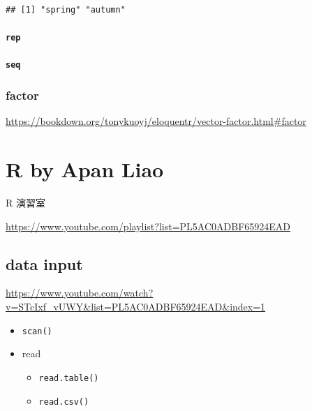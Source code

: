 \documentclass[
]{book}
\providecommand{\tightlist}{%
  \setlength{\itemsep}{0pt}\setlength{\parskip}{0pt}}
\theoremstyle{definition}
\theoremstyle{definition}
\theoremstyle{definition}
\theoremstyle{definition}
\theoremstyle{remark}
\begin{document}
\begin{verbatim}
## [1] "spring" "autumn"
\end{verbatim}

\hypertarget{rep}{%
\paragraph{\texorpdfstring{\texttt{rep}}{rep}}\label{rep}}

\hypertarget{seq}{%
\paragraph{\texorpdfstring{\texttt{seq}}{seq}}\label{seq}}

\hypertarget{factor}{%
\subsubsection{factor}\label{factor}}

\url{https://bookdown.org/tonykuoyj/eloquentr/vector-factor.html\#factor}

\hypertarget{r-by-apan-liao}{%
\section{R by Apan Liao}\label{r-by-apan-liao}}

\begin{CJK}{UTF8}{bsmi}
R 演習室
\end{CJK}

\url{https://www.youtube.com/playlist?list=PL5AC0ADBF65924EAD}

\hypertarget{data-input}{%
\subsection{data input}\label{data-input}}

\url{https://www.youtube.com/watch?v=STcIxf_vUWY\&list=PL5AC0ADBF65924EAD\&index=1}

\begin{itemize}
\tightlist
\item
  \texttt{scan()}
\item
  read

  \begin{itemize}
  \tightlist
  \item
    \texttt{read.table()}
  \item
    \texttt{read.csv()}
  \end{itemize}
\end{itemize}
\end{document}
